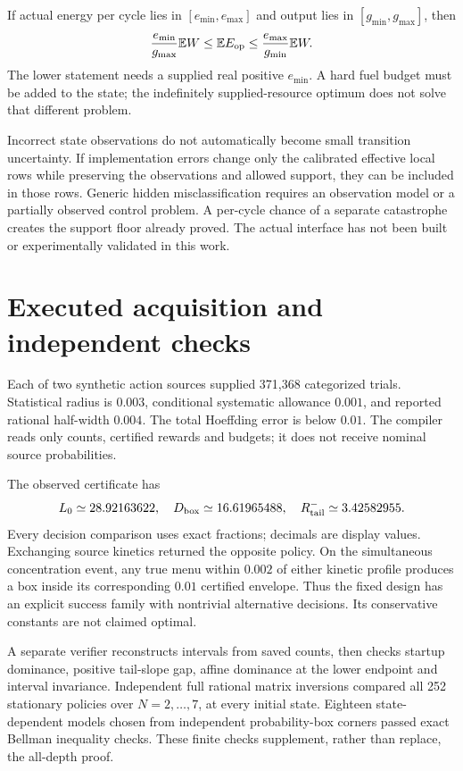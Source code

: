 \documentclass[10pt,a4paper]{article}
\newcommand{\E}{\mathbb E}\newcommand{\Pp}{\mathbb P}
\begin{document}
If actual energy per cycle lies in $[e_{\min},e_{\max}]$ and output lies in
$[g_{\min},g_{\max}]$, then
\[
\frac{e_{\min}}{g_{\max}}\E W\le \E E_{\rm op}
\le\frac{e_{\max}}{g_{\min}}\E W .
\]
The lower statement needs a supplied real positive $e_{\min}$. A hard fuel budget must be added to the state; the indefinitely supplied-resource optimum does not solve that different problem.

Incorrect state observations do not automatically become small transition uncertainty. If implementation errors change only the calibrated effective local rows while preserving the observations and allowed support, they can be included in those rows. Generic hidden misclassification requires an observation model or a partially observed control problem. A per-cycle chance of a separate catastrophe creates the support floor already proved. The actual interface has not been built or experimentally validated in this work.

\section{Executed acquisition and independent checks}

Each of two synthetic action sources supplied 371,368 categorized trials. Statistical radius is $0.003$, conditional systematic allowance $0.001$, and reported rational half-width $0.004$. The total Hoeffding error is below $0.01$. The compiler reads only counts, certified rewards and budgets; it does not receive nominal source probabilities.

The observed certificate has
\[
L_0\simeq28.92163622,\quad
D_{\rm box}\simeq16.61965488,\quad
R_{\rm tail}^-\simeq3.42582955 .
\]
Every decision comparison uses exact fractions; decimals are display values. Exchanging source kinetics returned the opposite policy. On the simultaneous concentration event, any true menu within $0.002$ of either kinetic profile produces a box inside its corresponding $0.01$ certified envelope. Thus the fixed design has an explicit success family with nontrivial alternative decisions. Its conservative constants are not claimed optimal.

A separate verifier reconstructs intervals from saved counts, then checks startup dominance, positive tail-slope gap, affine dominance at the lower endpoint and interval invariance. Independent full rational matrix inversions compared all 252 stationary policies over $N=2,\ldots,7$, at every initial state. Eighteen state-dependent models chosen from independent probability-box corners passed exact Bellman inequality checks. These finite checks supplement, rather than replace, the all-depth proof.
\end{document}
